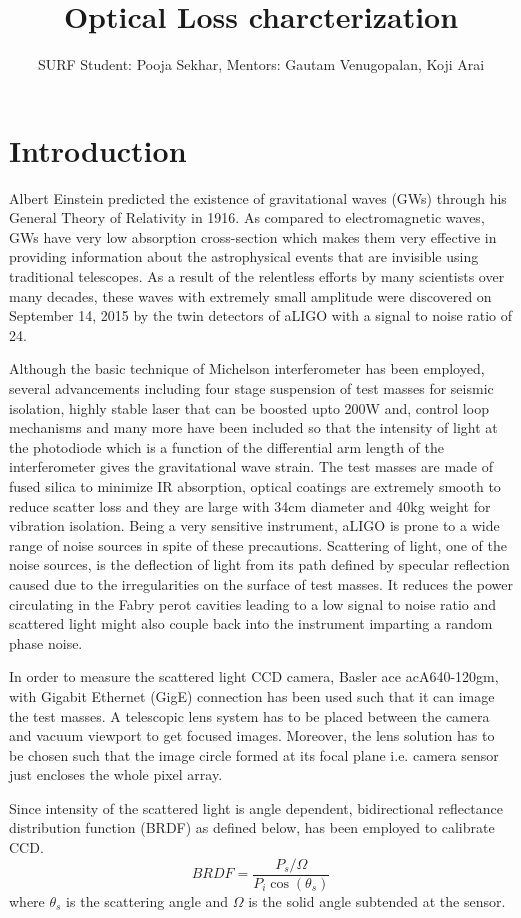 \documentclass[colorlinks=true,pdfstartview=FitV,linkcolor=blue,
            citecolor=red,urlcolor=magenta]{ligodoc}
\title{Optical Loss charcterization}
\author{SURF Student: Pooja Sekhar,
        Mentors: Gautam Venugopalan, Koji Arai}
\begin{document}
\section{Introduction}  
Albert Einstein predicted the existence of gravitational waves (GWs) through his General Theory of Relativity in 1916. As compared to electromagnetic waves, GWs have very low absorption cross-section which makes them very effective in providing information about the astrophysical events that are invisible using traditional telescopes. \cite{1} As a result of the relentless efforts by many scientists over many decades, these waves with extremely small amplitude were discovered on September 14, 2015 by the twin detectors of aLIGO with a signal to noise ratio of 24. \cite{2}

Although the basic technique of Michelson interferometer has been employed, several advancements including four stage suspension of test masses for seismic isolation, highly stable laser that can be boosted upto 200W and, control loop mechanisms and many more have been included so that the intensity of light at the photodiode which is a function of the differential arm length of the interferometer gives the gravitational wave strain. \cite{3} The test masses are made of fused silica to minimize IR absorption, optical coatings are extremely smooth to reduce scatter loss and they are large with 34cm diameter and 40kg weight for vibration isolation. \cite{4} Being a very sensitive instrument, aLIGO is prone to a wide range of noise sources in spite of these precautions. Scattering of light, one of the noise sources, is the deflection of light from its path defined by specular reflection caused due to the irregularities on the surface of test masses. It reduces the power circulating in the Fabry perot cavities leading to a low signal to noise ratio and scattered light might also couple back into the instrument imparting a random phase noise. 

In order to measure the scattered light CCD camera, Basler ace acA640-120gm, with Gigabit Ethernet (GigE) connection has been used such that it can image the test masses. A telescopic lens system has to be placed between the camera and vacuum viewport to get focused images. Moreover, the lens solution has to be chosen such that the image circle formed at its focal plane i.e. camera sensor just encloses the whole pixel array. \cite{5} 

Since intensity of the scattered light is angle dependent, bidirectional reflectance distribution function (BRDF) as defined below, has been employed to calibrate CCD. \cite{6}
\begin{equation}
    BRDF = \frac{P_{s}/\Omega}{P_{i} \cos(\theta_{s})}
\end{equation}
where $\theta_{s}$ is the scattering angle and $\Omega$ is the solid angle subtended at the sensor.
\end{document}

